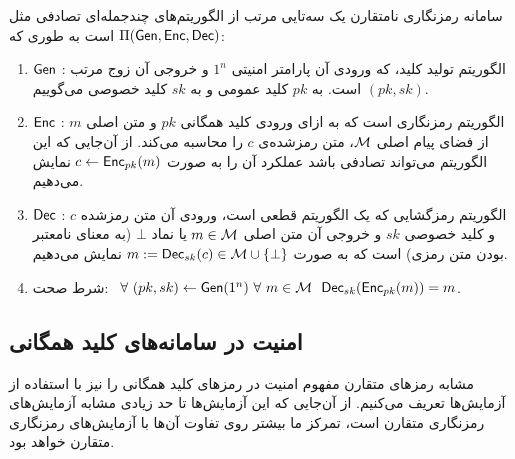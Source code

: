 \begin{definition}
سامانه رمزنگاری نامتقارن یک سه‌تایی مرتب از الگوریتم‌های چندجمله‌ای تصادفی مثل 
$\Pi(\mathsf{Gen}, \mathsf{Enc}, \mathsf{Dec})$
 است به طوری که:
\begin{enumerate}
\item
$\mathsf{Gen}$
: الگوریتم تولید کلید، که ورودی آن پارامتر امنیتی 
$1^{n}$
و خروجی آن زوج مرتب 
$(pk, sk)$
است. به 
$pk$
کلید عمومی و به 
$sk$
کلید خصوصی می‌گوییم.
\item
$\mathsf{Enc}$
: الگوریتم رمزنگاری است که به ازای ورودی کلید همگانی
$pk$
و متن اصلی 
$m$
از فضای پیام اصلی 
${\mathcal M}$، 
 متن رمز‌شده‌ی 
$c$
را محاسبه می‌کند. از آن‌جایی که این الگوریتم می‌تواند تصادفی باشد عملکرد آن را به صورت 
$c\leftarrow\mathsf{Enc}_{pk}(m)$
نمایش می‌دهیم.
\item
$\mathsf{Dec}$
: الگوریتم رمزگشایی که یک الگوریتم قطعی است، ورودی آن متن رمز‌شده
$c$
 و کلید خصوصی 
$sk$
و خروجی آن متن اصلی 
$m\in{\mathcal M}$
 یا نماد 
 $\bot$
(به معنای نامعتبر بودن متن رمزی) است که به صورت 
$m:=\mathsf{Dec}_{sk}(c)\in{\mathcal M}\cup \{\bot\}$
نمایش می‌دهیم.

\item
شرط صحت: \ 
$\forall \ (pk, sk)\leftarrow \mathsf{Gen}(1^{n}) \ \forall \ m\in{\mathcal M} \  \ \mathsf{Dec}_{sk}(\mathsf{Enc}_{pk}(m)) = m$.
\end{enumerate}

\end{definition}

\subsection*{امنیت در سامانه‌های کلید همگانی}
مشابه رمزهای متقارن مفهوم امنیت  در رمزهای کلید همگانی را نیز با استفاده از آزمایش‌ها تعریف می‌کنیم. از آن‌جایی که این آزمایش‌ها تا حد زیادی مشابه آزمایش‌های رمزنگاری متقارن است، تمرکز ما بیشتر روی تفاوت آن‌ها با آزمایش‌های رمزنگاری متقارن خواهد بود.
